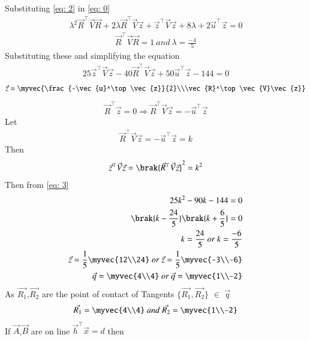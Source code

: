 \documentclass[journal]{IEEEtran}
\begin{document}
Substituting \eqref{eq: 2} in \eqref{eq: 0}
\begin{align}
\lambda^2\vec{R}^\top\vec{V}\vec{R} + 2\lambda\vec{R}^\top\vec{V}\vec{z} + \vec{z}^\top\vec{V}\vec{z} + 8\lambda + 2\vec{u}^\top\vec{z} = 0
\end{align}
\begin{align}
\vec{R}^\top\vec{V}\vec{R} = 1 \ and \ \lambda = \frac{-4}{5}
\end{align}
Substituting these and simplifying the equation
\begin{align}
25\vec{z}^\top\vec{V}\vec{z} - 40\vec{R}^\top\vec{V}\vec{z} + 50\vec{u}^\top\vec{z} - 144 = 0 \label{eq: 3}
\end{align}
\begin{align}
\vec{z} = \myvec{\frac{-\vec{u}^\top\vec{z}}{2}\\\vec{R}^\top\vec{V}\vec{z}}
\end{align}
\begin{align}
\vec{R}^\top\vec{z} = 0 \Longrightarrow \vec{R}^\top\vec{V}\vec{z} = -\vec{u}^\top\vec{z} 
\end{align}
Let
\begin{align}
\vec{R}^\top\vec{V}\vec{z} = -\vec{u}^\top\vec{z} = k
\end{align}
Then
\begin{align}
\vec{z}^\top\vec{V}\vec{z} = \brak{\vec{R}^\top\vec{V}\vec{z}}^2 = k^2
\end{align}
Then from \eqref{eq: 3}
\begin{align}
25k^2 - 90k - 144 = 0 \\
\brak{k - \frac{24}{5}}\brak{k + \frac{6}{5}} = 0 \\
k = \frac{24}{5} \ or \ k=\frac{-6}{5} \\
\vec{z} = \frac{1}{5}\myvec{12\\24} \ or \ \vec{z} = \frac{1}{5}\myvec{-3\\-6} \\
\vec{q} = \myvec{4\\4} \ or \ \vec{q} = \myvec{1\\-2}
\end{align}
As $\vec{R_1}$,$\vec{R_2}$ are the point of contact of Tangents $\{\vec{R_1},\vec{R_2}\}$ $\in$ $\vec{q}$
\begin{align}
\vec{R_1} = \myvec{4\\4} \ and \ \vec{R_2} = \myvec{1\\-2}
\end{align}
If $\vec{A}$,$\vec{B}$ are on line $\vec{h}^\top\vec{x}=d$ then
\end{document}
